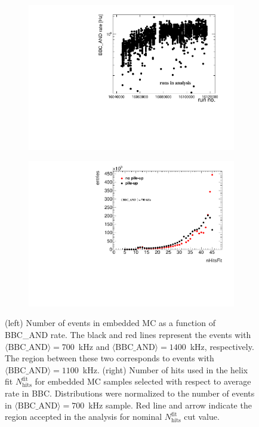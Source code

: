 \begin{figure}[h!]%
	\centering%
	\begin{subfigure}{.49\textwidth}
		\includegraphics[width=1.\linewidth,page=5]{chapters/chrgSTAR/img/tpcEffi/Out.pdf}
	\end{subfigure}
	\begin{subfigure}{.49\textwidth}
		\includegraphics[width=1.\linewidth,page=4]{chapters/chrgSTAR/img/tpcEffi/meanNHits.pdf}
	\end{subfigure}
	
	\caption{(left) Number of events in embedded MC as a function of BBC\_AND rate. The black and red lines represent the events with \mbox{$\langle\text{BBC\_AND}\rangle=700$~kHz} and \mbox{$\langle\text{BBC\_AND}\rangle=1400$~kHz},  respectively. The region between these two corresponds to events with \mbox{$\langle\text{BBC\_AND}\rangle=1100$~kHz}. (right) Number of hits used in the helix fit $N_\textrm{hits}^\textrm{fit}$ for embedded MC samples  selected with respect to average rate in BBC. Distributions were normalized to the number of events in \mbox{$\langle\text{BBC\_AND}\rangle=700$~kHz} sample. Red line and arrow indicate the region accepted in the analysis for nominal $N_\textrm{hits}^\textrm{fit}$ cut value.}
	\label{fig:events_bbc_and}
\end{figure}


